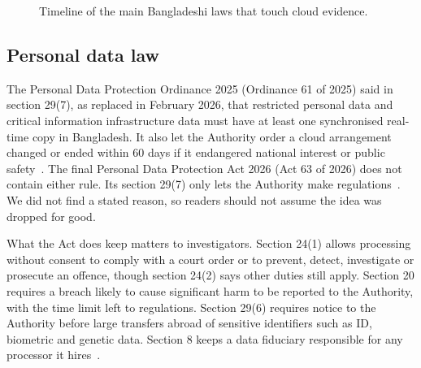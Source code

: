 \documentclass[conference]{IEEEtran}
\begin{document}
\begin{figure}[t]
\centering
{}
\caption{Timeline of the main Bangladeshi laws that touch cloud evidence.}
\label{fig:timeline}
\end{figure}

\subsection{Personal data law}
The Personal Data Protection Ordinance 2025 (Ordinance 61 of 2025) said in section 29(7), as replaced in February 2026, that restricted personal data and critical information infrastructure data must have at least one synchronised real-time copy in Bangladesh. It also let the Authority order a cloud arrangement changed or ended within 60 days if it endangered national interest or public safety~\cite{pdpo}. The final Personal Data Protection Act 2026 (Act 63 of 2026) does not contain either rule. Its section 29(7) only lets the Authority make regulations~\cite{pdpa}. We did not find a stated reason, so readers should not assume the idea was dropped for good.

What the Act does keep matters to investigators. Section 24(1) allows processing without consent to comply with a court order or to prevent, detect, investigate or prosecute an offence, though section 24(2) says other duties still apply. Section 20 requires a breach likely to cause significant harm to be reported to the Authority, with the time limit left to regulations. Section 29(6) requires notice to the Authority before large transfers abroad of sensitive identifiers such as ID, biometric and genetic data. Section 8 keeps a data fiduciary responsible for any processor it hires~\cite{pdpa}.
\end{document}

